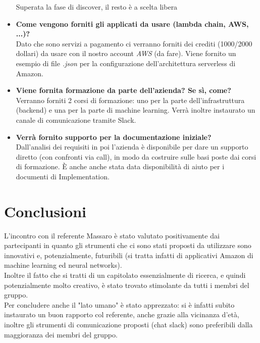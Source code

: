 \documentclass{classes/base}
\begin{document}
\begin{itemize}
            Superata la fase di discover, il resto è a scelta libera        
        \item  \textbf{Come vengono forniti gli applicati da usare (lambda chain, AWS, ...)?}
        \\Dato che sono servizi a pagamento ci verranno forniti dei crediti (1000/2000 dollari) da usare con il nostro account \textit{AWS} (da fare).
            Viene fornito un esempio di file \textit{.json} per la configurazione dell’architettura serverless di Amazon.
        \item  \textbf{Viene fornita formazione da parte dell'azienda? Se sì, come?}
        \\Verranno forniti 2 corsi di formazione: uno per la parte dell’infrastruttura (backend) e una per la parte di machine learning.
            Verrà inoltre instaurato un canale di comunicazione tramite Slack.        
        \item  \textbf{Verrà fornito supporto per la documentazione iniziale?}
        \\Dall’analisi dei requisiti in poi l'azienda è disponibile per dare un supporto diretto (con confronti via call), in modo da costruire sulle basi poste dai corsi di formazione.
        È anche anche stata data disponibilità di aiuto per i documenti di Implementation.
    \end{itemize}

    \section*{Conclusioni}
    L’incontro con il referente Massaro è stato valutato positivamente dai partecipanti in quanto gli strumenti che ci sono stati proposti da utilizzare sono innovativi e, potenzialmente, futuribili (si tratta infatti di applicativi Amazon di machine learning ed neural networks).\\
    Inoltre il fatto che si tratti di un capitolato essenzialmente di ricerca, e quindi potenzialmente molto creativo, è stato trovato stimolante da tutti i membri del gruppo.\\
    Per concludere anche il "lato umano" è stato apprezzato: si è infatti subito instaurato un buon rapporto col referente, anche grazie alla vicinanza d'età, inoltre gli strumenti di comunicazione proposti (chat slack) sono preferibili dalla maggioranza dei membri del gruppo.
\end{document}
